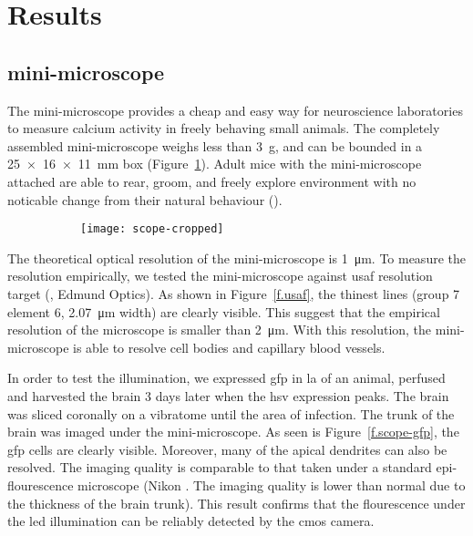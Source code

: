 \section{Results}

\subsection{mini-microscope}
The mini-microscope provides a cheap and easy way for neuroscience laboratories to measure calcium activity in freely behaving small animals. The completely assembled mini-microscope weighs less than \SI{3}{\g}, and can be bounded in a \SI{25 x 16 x 11}{\mm} box (Figure~\ref{f.scope}). Adult mice with the mini-microscope attached are able to rear, groom, and freely explore environment with no noticable change from their natural behaviour ().

\begin{figure}[h]
    \begin{subfigure}[t]{.5\textwidth}
        \centering
        \texttt{[image: scope-cropped]}
        \caption{\label{f.scope}}
    \end{subfigure}
    \begin{subfigure}[t]{.5\textwidth}
        \centering
    \end{subfigure}
\end{figure}

The theoretical optical resolution of the mini-microscope is \SI{1}{\um}. To measure the resolution empirically, we tested the mini-microscope against \gls{usaf} resolution target (, Edmund Optics). As shown in Figure~\ref{f.usaf}, the thinest lines (group 7 element 6, \SI{2.07}{\um} width) are clearly visible. This suggest that the empirical resolution of the microscope is smaller than \SI{2}{\um}. With this resolution, the mini-microscope is able to resolve cell bodies and capillary blood vessels.

In order to test the illumination, we expressed \gls{gfp} in \gls{la} of an animal, perfused and harvested the brain 3 days later when the \gls{hsv} expression peaks. The brain was sliced coronally on a vibratome until the area of infection. The trunk of the brain was imaged under the mini-microscope. As seen is Figure~\ref{f.scope-gfp}, the \gls{gfp} cells are clearly visible. Moreover, many of the apical dendrites can also be resolved. The imaging quality is comparable to that taken under a standard epi-flourescence microscope (Nikon . The imaging quality is lower than normal due to the thickness of the brain trunk). This result confirms that the flourescence under the \gls{led} illumination can be reliably detected by the \gls{cmos} camera.

